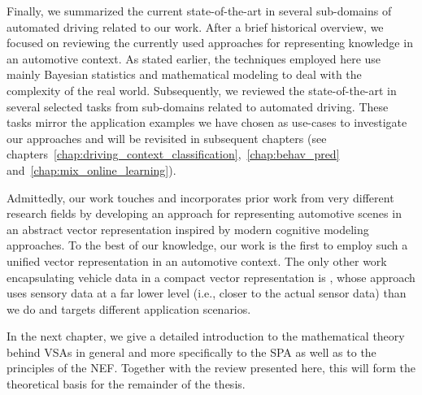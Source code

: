Finally, we summarized the current state-of-the-art in several sub-domains of automated driving related to our work.
After a brief historical overview, we focused on reviewing the currently used approaches for representing knowledge in an automotive context.
As stated earlier, the techniques employed here use mainly Bayesian statistics and mathematical modeling to deal with the complexity of the real world.
Subsequently, we reviewed the state-of-the-art in several selected tasks from sub-domains related to automated driving.
These tasks mirror the application examples we have chosen as use-cases to investigate our approaches and will be revisited in subsequent chapters (see chapters~\ref{chap:driving_context_classification},~\ref{chap:behav_pred} and~\ref{chap:mix_online_learning}).

Admittedly, our work touches and incorporates prior work from very different research fields by developing an approach for representing automotive scenes in an abstract vector representation inspired by modern cognitive modeling approaches.
To the best of our knowledge, our work is the first to employ such a unified vector representation in an automotive context.
The only other work encapsulating vehicle data in a compact vector representation is \cite{Hallac2018}, whose approach uses sensory data at a far lower level (i.e., closer to the actual sensor data) than we do and targets different application scenarios.

In the next chapter, we give a detailed introduction to the mathematical theory behind \acp{VSA} in general and more specifically to the \ac{SPA} as well as to the principles of the \ac{NEF}.
Together with the review presented here, this  will form the theoretical basis for the remainder of the thesis.
